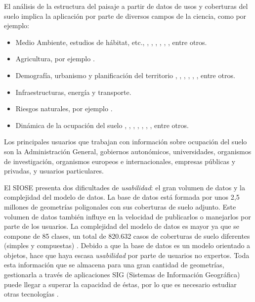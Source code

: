 El análisis de la estructura del paisaje a partir de datos de usos y coberturas del suelo implica la aplicación por parte de diversos campos de la ciencia, como por ejemplo:
\begin{itemize}
\item Medio Ambiente, estudios de hábitat, etc., \cite{Gine2014}, \cite{Hamilton2009}, \cite{Hebeisen2008}, \cite{GimenezFont2010}, \cite{Lin2014}, \cite{Brennan2005}, entre otros.
\item Agricultura, por ejemplo \cite{Zaragozi2011}.
\item Demografía, urbanismo y planificación del territorio \cite{Aguilera2011}, \cite{Blaschke1999}, \cite{Jacquin2008}, \cite{Tudor2014}, \cite{Aguilera2010}, \cite{Prastacos2017}, entre otros.
\item Infraestructuras, energía y transporte.
\item Riesgos naturales, por ejemplo \cite{Vazquez2017}.
\item Dinámica de la ocupación del suelo \cite{VanderKwast2011}, \cite{Dunk2011}, \cite{Herold2002}, \cite{Roces-Diaz2014}, \cite{Aguilera2012}, \cite{Liu2016}, \cite{Rodriguez-Rodriguez2017}, entre otros.
\end{itemize}

Los principales usuarios que trabajan con información sobre ocupación del suelo son la Administración General, gobiernos autonómicos, universidades, organismos de investigación, organismos europeos e internacionales, empresas públicas y privadas, y usuarios particulares.

El SIOSE presenta dos dificultades de \textit{usabilidad}: el gran volumen de datos y la complejidad del modelo de datos. La base de datos está formada por unos 2,5 millones de geometrías poligonales con sus coberturas de suelo adjunto. Este volumen de datos también influye en la velocidad de publicarlos o manejarlos por parte de los usuarios. La complejidad del modelo de datos es mayor ya que se compone de 85 clases, un total de 820.632 casos de coberturas de suelo diferentes (simples y compuestas) \cite{FernandezVillarino2012}. Debido a que la base de datos es un modelo orientado a objetos, hace que haya escasa \textit{usabilidad} por parte de usuarios no expertos. Toda esta información que se almacena para una gran cantidad de geometrías, gestionarla a través de aplicaciones SIG (Sistemas de Información Geográfica) puede llegar a superar la capacidad de éstas, por lo que es necesario estudiar otras tecnologías \cite{NavarroCarrion2016}.

